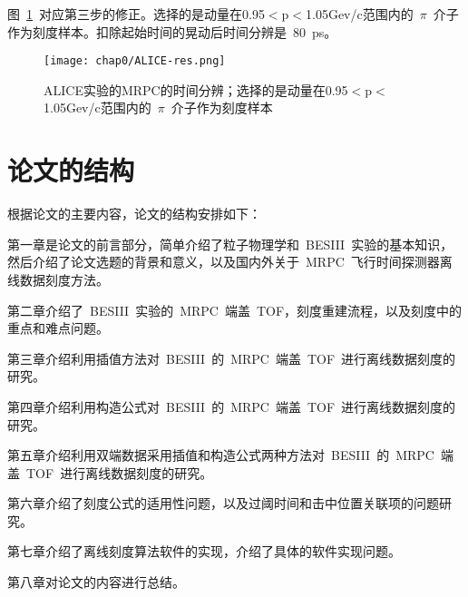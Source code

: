图~\ref{fig:ALICE-res}~对应第三步的修正。选择的是动量在0.95$<$p$<$1.05Gev/c范围内的~$\pi$~介子作为刻度样本。扣除起始时间的晃动后时间分辨是~80~ps。
\begin{figure}[!h]
  \centering
  \texttt{[image: chap0/ALICE-res.png]}
  \caption{ALICE实验的MRPC的时间分辨；选择的是动量在0.95$<$p$<$1.05Gev/c范围内的~$\pi$~介子作为刻度样本}
  \label{fig:ALICE-res}
\end{figure}

\section{论文的结构}
根据论文的主要内容，论文的结构安排如下：

第一章是论文的前言部分，简单介绍了粒子物理学和~BESIII~实验的基本知识，然后介绍了论文选题的背景和意义，以及国内外关于~MRPC~飞行时间探测器离线数据刻度方法。

第二章介绍了~BESIII~实验的~MRPC~端盖~TOF，刻度重建流程，以及刻度中的重点和难点问题。

第三章介绍利用插值方法对~BESIII~的~MRPC~端盖~TOF~进行离线数据刻度的研究。

第四章介绍利用构造公式对~BESIII~的~MRPC~端盖~TOF~进行离线数据刻度的研究。

第五章介绍利用双端数据采用插值和构造公式两种方法对~BESIII~的~MRPC~端盖~TOF~进行离线数据刻度的研究。

第六章介绍了刻度公式的适用性问题，以及过阈时间和击中位置关联项的问题研究。

第七章介绍了离线刻度算法软件的实现，介绍了具体的软件实现问题。

第八章对论文的内容进行总结。











